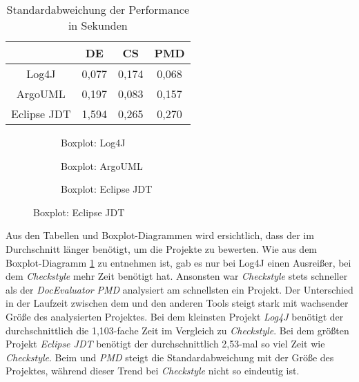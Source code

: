  \begin{table}[ht!]
     \centering
     \begin{tabular}{c|S|S|S}
        & {DE} & {CS} & {PMD}  \\\hline
        Log4J & 0,077 &  0,174 &  0,068\\\hline 
        ArgoUML & 0,197 &  0,083 & 0,157 \\\hline
        Eclipse \ac{JDT} & 1,594 & 0,265 & 0,270\\\hline
     \end{tabular}
     \caption{Standardabweichung der Performance in Sekunden}
     \label{tab:std_speed}
 \end{table}
 
 \begin{figure}
 \centering
    \begin{subfigure}[b]{0.49\textwidth}
    \centering

    \caption{Boxplot: Log4J}
    \label{fig:log4j_box}
\end{subfigure}
\hspace{0.01cm}
 \begin{subfigure}[b]{0.49\textwidth}
    \centering

    \caption{Boxplot: ArgoUML}
    \label{fig:argo_box}
\end{subfigure}

 \begin{subfigure}[b]{0.49\textwidth}
    \centering

    \caption{Boxplot: Eclipse \ac{JDT} }
    \label{fig:eclipse_box}
\end{subfigure}
   
 \end{figure}
 

Aus den Tabellen und Boxplot-Diagrammen wird ersichtlich, dass der \doceval im Durchschnitt länger benötigt, um die Projekte zu bewerten. Wie aus dem Boxplot-Diagramm \ref{fig:log4j_box} zu entnehmen ist, gab es nur bei Log4J einen Ausreißer, bei dem \textit{Checkstyle} mehr Zeit benötigt hat.   Ansonsten war \textit{Checkstyle} stets schneller als der \textit{DocEvaluator} \textit{PMD} analysiert am schnellsten ein Projekt. Der Unterschied in der Laufzeit zwischen dem \doceval und den anderen Tools steigt stark  mit wachsender Größe des analysierten Projektes.  Bei dem kleinsten Projekt \textit{Log4J} benötigt der \doceval  durchschnittlich die 1,103-fache Zeit im Vergleich zu \textit{Checkstyle}. Bei dem größten Projekt \textit{Eclipse \ac{JDT}} benötigt der \doceval durchschnittlich 2,53-mal so viel Zeit wie \textit{Checkstyle}. Beim \doceval und \textit{PMD} steigt die Standardabweichung mit der Größe des Projektes, während dieser Trend bei \textit{Checkstyle} nicht so eindeutig ist.

